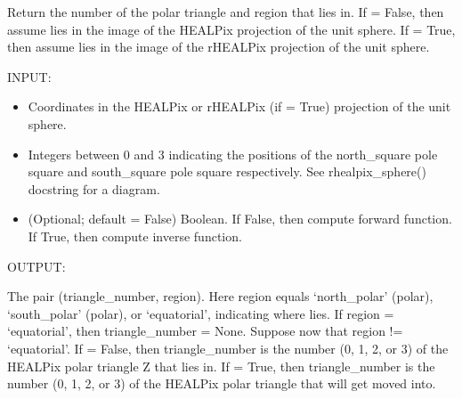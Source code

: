 \documentclass[a4paper,12ptopenany,oneside,english]{sphinxmanual}
\begin{document}

\begin{fulllineitems}
\label{\detokenize{pj_rhealpix:rhealpixdggs.pj_rhealpix.triangle}}
\pysigstartsignatures
{}
\pysigstopsignatures
\sphinxAtStartPar
Return the number of the polar triangle and region that  lies in.
If  = False, then assume  lies in the image of the HEALPix
projection of the unit sphere.
If  = True, then assume  lies in the image of the
\sphinxhyphen{}rHEALPix projection of the unit sphere.

\sphinxAtStartPar
INPUT:
\begin{itemize}
\item {} 
\sphinxAtStartPar
{} \sphinxhyphen{} Coordinates in the HEALPix or rHEALPix (if  = True)
projection of the unit sphere.

\item {} 
\sphinxAtStartPar
{} \sphinxhyphen{} Integers between 0 and 3 indicating the
positions of the north\_square pole square and south\_square pole square
respectively.
See rhealpix\_sphere() docstring for a diagram.

\item {} 
\sphinxAtStartPar
{} \sphinxhyphen{} (Optional; default = False) Boolean. If False, then compute
forward function. If True, then compute inverse function.

\end{itemize}

\sphinxAtStartPar
OUTPUT:

\sphinxAtStartPar
The pair (triangle\_number, region).
Here region equals ‘north\_polar’ (polar), ‘south\_polar’ (polar), or
‘equatorial’, indicating where  lies.
If region = ‘equatorial’, then triangle\_number = None.
Suppose now that region != ‘equatorial’.
If  = False, then triangle\_number is the number (0, 1, 2, or 3) of
the HEALPix polar triangle Z that  lies in.
If  = True, then triangle\_number is the number (0, 1, 2, or 3) of
the HEALPix polar triangle that  will get moved into.


\end{fulllineitems}
\end{document}
